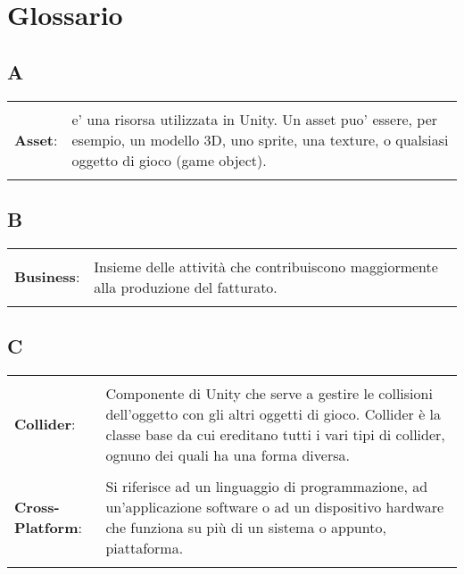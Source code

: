 \setcounter{secnumdepth}{0}
\pagestyle{empty}
\section{Glossario}

\allsectionsfont{\raggedleft\huge}


\subsection{A}{
	\normalsize
	\begin{longtable}{p{} p{}} 
		\\
		\textbf{Asset}:		&	 e' una risorsa utilizzata in Unity. Un asset puo' essere, per esempio, un modello 3D, uno sprite, una texture, o qualsiasi oggetto di gioco (game object).\\
	\end{longtable}



\subsection{B}{
	\normalsize
	\begin{longtable}{p{} p{}} 
		\\
		\textbf{Business}:		&	 Insieme delle attività che contribuiscono maggiormente alla produzione del fatturato.\\
	\end{longtable}

\subsection{C}{
	\normalsize
	\begin{longtable}{p{} p{}} 
		
		\\
		\textbf{Collider}:		&	 Componente di Unity che serve a gestire le collisioni dell'oggetto con gli altri oggetti di gioco. Collider è la classe base da cui ereditano tutti i vari tipi di collider, ognuno dei quali ha una forma diversa.\\
		
		\\
		\textbf{Cross-Platform}:		&	 Si riferisce ad un linguaggio di programmazione, ad un'applicazione software o ad un dispositivo hardware che funziona su più di un sistema o appunto, piattaforma.\\
	\end{longtable}
	
}}}
